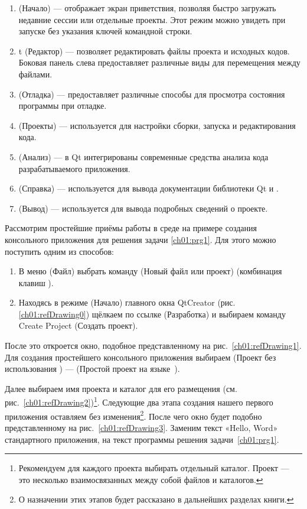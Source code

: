 \begin{enumerate}
\item {} (Начало) --- отображает экран приветствия, позволяя быстро загружать недавние сессии или отдельные
проекты. Этот режим можно увидеть при запуске  без указания ключей командной строки.
\item {}t (Редактор) --- позволяет редактировать файлы проекта и исходных кодов. Боковая панель слева
предоставляет различные виды для перемещения между файлами.
\item {} (Отладка) --- предоставляет различные способы для просмотра состояния программы при отладке.
\item {} (Проекты) --- используется для настройки сборки, запуска и редактирования кода.
\item {} (Анализ) --- в Qt интегрированы современные средства анализа кода разрабатываемого приложения.
\item {} (Справка) --- используется для вывода документации библиотеки Qt и .
\item {} (Вывод) --- используется для вывода подробных сведений о проекте.
\end{enumerate}

Рассмотрим простейшие приёмы работы в среде  на примере создания
консольного приложения для решения задачи \ref{ch01:prg1}. Для этого можно поступить одним из способов:

\begin{enumerate}
\item В меню  (Файл) выбрать команду  (Новый файл или проект) (комбинация
клавиш ).
\item Находясь в режиме  (Начало) главного окна QtCreator (рис. \ref{ch01:refDrawing0}) щёлкаем по ссылке
 (Разработка) и выбираем команду Create Project (Создать проект).
\end{enumerate}

После это откроется окно, подобное представленному на рис.~\ref{ch01:refDrawing1}. Для создания простейшего консольного
приложения выбираем  (Проект без использования ) ---  (Простой проект
на языке~).

Далее выбираем имя проекта и каталог для его размещения (см. рис.~\ref{ch01:refDrawing2})\footnote{Рекомендуем для
каждого проекта выбирать отдельный каталог. Проект --- это несколько
взаимосвязанных между собой файлов и каталогов.}. Следующие два этапа создания нашего первого приложения оставляем без
изменения\footnote{О назначении этих этапов будет рассказано в дальнейших разделах книги.}. После чего окно  будет подобно представленному на рис.~\ref{ch01:refDrawing3}. Заменим текст «Hello, Word» стандартного
приложения, на текст программы решения задачи~\ref{ch01:prg1}.

